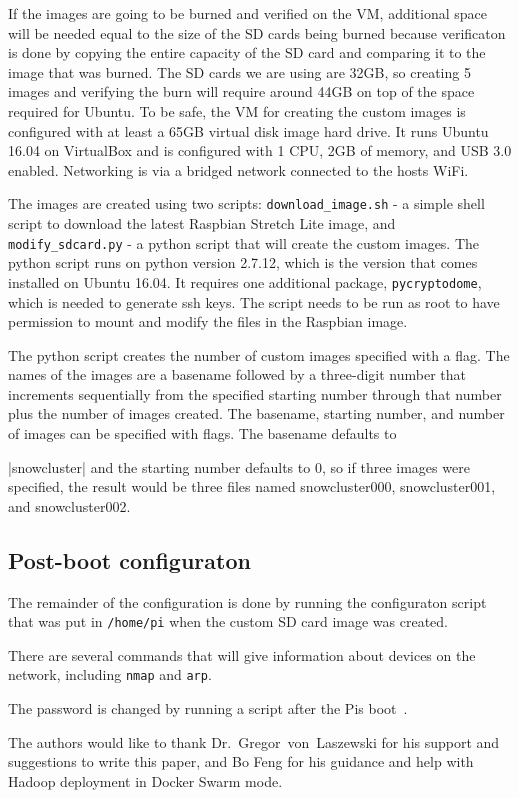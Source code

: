 If the images are going to be burned and verified on the VM,
additional space will be needed equal to the size of the SD cards
being burned because verificaton is done by copying the entire
capacity of the SD card and comparing it to the image that was
burned. The SD cards we are using are 32GB, so creating 5 images and
verifying the burn will require around 44GB on top of the space
required for Ubuntu. To be safe, the VM for creating the custom images
is configured with at least a 65GB virtual disk image hard drive.  It
runs Ubuntu 16.04 on VirtualBox and is configured with 1 CPU, 2GB of
memory, and USB 3.0 enabled. Networking is via a bridged network
connected to the hosts WiFi.

The images are created using two scripts: \verb|download_image.sh| - a
simple shell script to download the latest Raspbian Stretch Lite
image, and \verb|modify_sdcard.py| - a python script that will create
the custom images. The python script runs on python version 2.7.12,
which is the version that comes installed on Ubuntu 16.04. It requires
one additional package, \verb|pycryptodome|, which is needed to
generate ssh keys. The script needs to be run as root to have
permission to mount and modify the files in the Raspbian image.

The python script creates the number of custom images specified with a
flag. The names of the images are a basename followed by a three-digit
number that increments sequentially from the specified starting number
through that number plus the number of images created. The basename,
starting number, and number of images can be specified with flags. The
basename defaults to \item|snowcluster| and the starting number
defaults to 0, so if three images were specified, the result would be
three files named snowcluster000, snowcluster001, and snowcluster002.

\subsection{Post-boot configuraton}
The remainder of the configuration is done by running the configuraton
script that was put in \verb|/home/pi| when the custom SD card image
was created.

There are several commands that will give information about devices on
the network, including \verb|nmap| and \verb|arp|.

The password is changed by running a script after the Pis
boot~\cite{hid-sp18-419-so-password}.

\begin{acks}

  The authors would like to thank Dr.~Gregor~von~Laszewski for his
  support and suggestions to write this paper, and Bo Feng for his guidance 
  and help with Hadoop deployment in Docker Swarm mode.

\end{acks}



